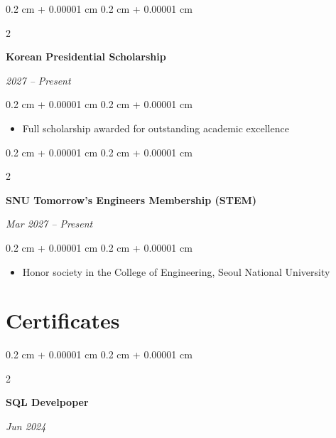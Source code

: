 \documentclass[10pt, letterpaper]{article}
\newenvironment{highlights}{
    \begin{itemize}[
        topsep=0.10 cm,
        parsep=0.10 cm,
        partopsep=0pt,
        itemsep=0pt,
        leftmargin=0.4 cm + 10pt
    ]
}{
    \end{itemize}
} %
\newenvironment{onecolentry}{
    \begin{adjustwidth}{
        0.2 cm + 0.00001 cm
    }{
        0.2 cm + 0.00001 cm
    }
}{
    \end{adjustwidth}
} %
\newenvironment{twocolentry}[2][]{
    \onecolentry
    \def\secondColumn{#2}
    \setcolumnwidth{\fill, 4.5 cm}
    \begin{paracol}{2}
}{
    \switchcolumn \raggedleft \secondColumn
    \end{paracol}
    \endonecolentry
} %
\begin{document}
        \vspace{0.2 cm}

        \begin{twocolentry}{
            
            
        \textit{2027 – Present}}
            \textbf{Korean Presidential Scholarship}
        \end{twocolentry}

        \vspace{0.10 cm}
        \begin{onecolentry}
            \begin{highlights}
                \item Full scholarship awarded for outstanding academic excellence
            \end{highlights}
        \end{onecolentry}

        \vspace{0.2 cm}

        \begin{twocolentry}{
            
            
        \textit{Mar 2027 – Present}}
            \textbf{SNU Tomorrow's Engineers Membership (STEM)}
        \end{twocolentry}

        \vspace{0.10 cm}
        \begin{onecolentry}
            \begin{highlights}
                \item Honor society in the College of Engineering, Seoul National University
            \end{highlights}
        \end{onecolentry}

        \vspace{0.2 cm}
    
    \section{Certificates}

        \begin{twocolentry}{
            
        \textit{Jun 2024}}
            \textbf{SQL Develpoper}
        \end{twocolentry}

         \vspace{0.2 cm}
\end{document}
